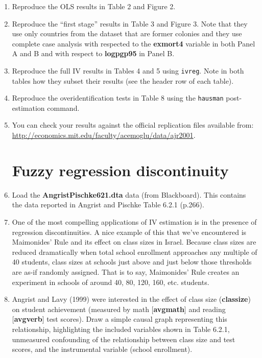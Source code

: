 \documentclass[a4paper,12pt]{article}
\begin{document}
\begin{enumerate}
\item Reproduce the OLS results in Table 2 and Figure 2.

\item Reproduce the ``first stage'' results in Table 3 and Figure 3. Note that they use only countries from the dataset that are former colonies and they use complete case analysis with respected to the \textbf{exmort4} variable in both Panel A and B and with respect to \textbf{logpgp95} in Panel B.

\item Reproduce the full IV results in Tables 4 and 5 using \texttt{ivreg}. Note in both tables how they subset their results (see the header row of each table).

\item Reproduce the overidentification tests in Table 8 using the \texttt{hausman} post-estimation command.

\item You can check your results against the official replication files available from:\\ \url{http://economics.mit.edu/faculty/acemoglu/data/ajr2001}.

\section*{Fuzzy regression discontinuity}

\item Load the \textbf{AngristPischke621.dta} data (from Blackboard). This contains the data reported in Angrist and Pischke Table 6.2.1 (p.266).

\item One of the most compelling applications of IV estimation is in the presence of regression discontinuities. A nice example of this that we've encountered is Maimonides' Rule and its effect on class sizes in Israel. Because class sizes are reduced dramatically when total school enrollment approaches any multiple of 40 students, class sizes at schools just above and just below those thresholds are as-if randomly assigned. That is to say, Maimonides' Rule creates an experiment in schools of around 40, 80, 120, 160, etc. students.

\item Angrist and Lavy (1999) were interested in the effect of class size (\textbf{classize}) on student achievement (measured by math [\textbf{avgmath}] and reading [\textbf{avgverb}] test scores). Draw a simple causal graph representing this relationship, highlighting the included variables shown in Table 6.2.1, unmeasured confounding of the relationship between class size and test scores, and the instrumental variable (school enrollment).


\end{enumerate}
\end{document}
